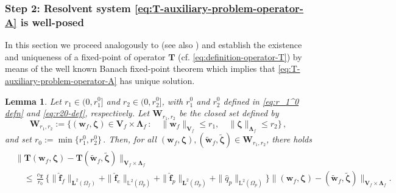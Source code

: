 \documentclass[11pt]{article}
\numberwithin{equation}{section}
\newcommand{\bLambda}{{\boldsymbol\Lambda}}
\newcommand{\bzeta}{{\boldsymbol\zeta}}
\newcommand{\bw}{{\mathbf{w}}}
\newcommand{\f}{\mathbf{f}}
\newcommand{\0}{{\mathbf{0}}}
\def\bV{\mathbf{V}}
\def\bW{\mathbf{W}}
\def\bT{\mathbf{T}}
\newcommand{\bL}{\mathbf{L}}
\newcommand\bbL{\mathbb{L}}
\def\L{\mathrm{L}}
\def\wt{\widetilde}
\def\wh{\widehat}
\newtheorem{lem}[thm]{Lemma}
\numberwithin{equation}{section}
\begin{document}
\subsubsection[]{Step 2: Resolvent system \eqref{eq:T-auxiliary-problem-operator-A} is well-posed}\label{sec:domain-D-nonempty}

In this section we proceed analogously to \cite{cgos2017} (see also \cite{cgo2021}) and establish the existence and uniqueness of a fixed-point of operator $\bT$ (cf. \eqref{eq:definition-operator-T}) by means of the well known Banach fixed-point theorem which implies that \eqref{eq:T-auxiliary-problem-operator-A} has unique solution.

\begin{lem}\label{lem:T-contraction-mapping}
Let $r_1\in (0,r_1^0]$ and $r_2\in (0,r_2^0]$, with $r_1^0$ and $r_2^0$ defined in \eqref{eq:r_1^0 defn} and \eqref{eq:r20-def}, respectively. Let $\bW_{r_1,r_2}$ be the closed set defined by
\begin{equation}\label{eq:Wr-definition}
\bW_{r_1,r_2} := \Big\{ (\bw_f,\bzeta)\in \bV_f\times \bLambda_f \,:\quad \| \bw_f\|_{\bV_f} \leq r_1,\quad \|\bzeta\|_{\bLambda_f} \leq r_2 \Big\}\,,
\end{equation}
and set $r_0:=\min\big\{r_1^0, r_2^0\big\}\,.$ Then, for all $(\bw_f,\bzeta), (\wt{\bw}_f,\wt{\bzeta}) \in \bW_{r_1,r_2}$, there holds
\begin{align}
&\|\bT(\bw_f,\bzeta) - \bT(\wt{\bw}_f,\wt{\bzeta}) \|_{\bV_f\times \bLambda_f} \nonumber \\
& \quad \leq\, \frac{c_\bT}{r_0}\,\Big\{ \|\wh{\f}_f\|_{\bL^2(\Omega_f)} +  \|\wh{\f}_e\|_{\bbL^2(\Omega_p)}+ \|\wh{\f}_p\|_{\bL^2(\Omega_p)} + \| \wh{q}_p\|_{\L^2(\Omega_p)} \Big\} \|(\bw_f,\bzeta) - (\wt{\bw}_f,\wt{\bzeta})\|_{\bV_f\times \bLambda_f}.\label{eq:Lipschitz-continuity}
\end{align}
\end{lem}
%
\end{document}

